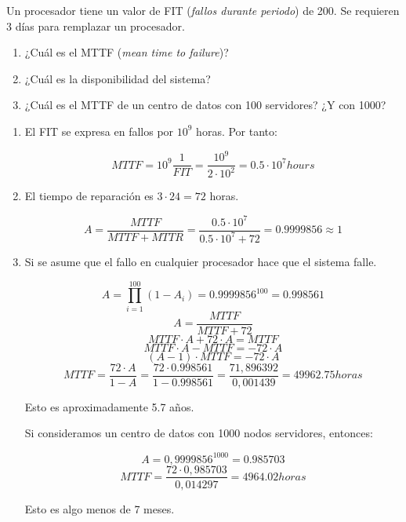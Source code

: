 \begin{acexercise}\end{acexercise}

Un procesador tiene un valor de FIT (\emph{fallos durante periodo}) de 200.
Se requieren 3 días para remplazar un procesador.

\begin{enumerate}

\item ¿Cuál es el MTTF (\emph{mean time to failure})?

\item ¿Cuál es la disponibilidad del sistema?

\item ¿Cuál es el MTTF de un centro de datos con 100 servidores? ¿Y con 1000?

\end{enumerate}

\begin{acsolution}\end{acsolution}

\begin{enumerate}

\item El FIT se expresa en fallos por $10^9$ horas. Por tanto:

\[MTTF = 10^9 \frac{1}{FIT} = \frac{10^9}{2 \cdot 10^2} = 0.5 \cdot 10^7 hours\]

\item El tiempo de reparación es $3 \cdot 24 = 72$ horas.

\[
A = \frac{MTTF}{MTTF + MTTR} =
\frac{0.5 \cdot 10^7}{0.5 \cdot 10^7 + 72} =
0.9999856 \approx 1
\]

\item Si se asume que el fallo en cualquier procesador hace que el sistema falle.

\[
A = \prod_{i=1}^{100}(1 - A_i) = 0.9999856^{100} = 0.998561
\]
\[A = \frac{MTTF}{MTTF + 72} \]
\[MTTF \cdot A + 72 \cdot A = MTTF\]
\[MTTF \cdot A - MTTF = - 72 \cdot A\]
\[(A-1) \cdot MTTF = - 72 \cdot A\]
\[MTTF = \frac{72 \cdot A}{1 - A} = \frac{72 \cdot 0.998561}{1-0.998561} =
\frac{71,896392}{0,001439} =
49962.75 horas
\]

Esto es aproximadamente 5.7 años.

Si consideramos un centro de datos con 1000 nodos servidores, entonces:

\[A = 0,9999856^{1000} = 0.985703\]
\[MTTF = \frac{72 \cdot 0,985703}{0,014297} = 4964.02 horas\]

Esto es algo menos de 7 meses.

\end{enumerate}

